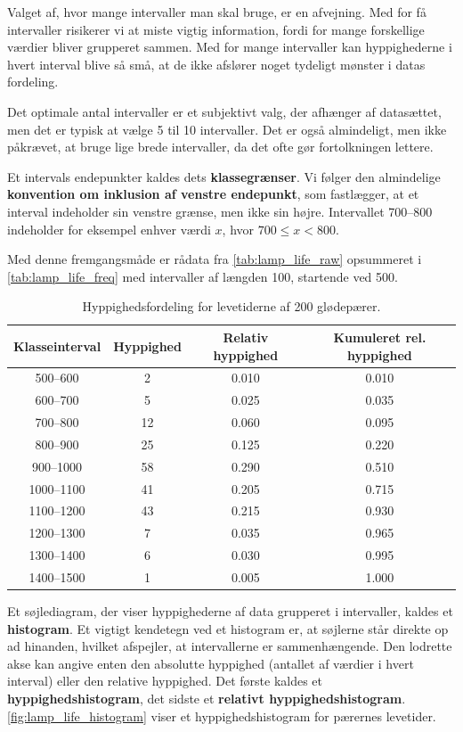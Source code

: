 Valget af, hvor mange intervaller man skal bruge, er en afvejning. Med for få intervaller risikerer vi at miste vigtig information, fordi for mange forskellige værdier bliver grupperet sammen. Med for mange intervaller kan hyppighederne i hvert interval blive så små, at de ikke afslører noget tydeligt mønster i datas fordeling.

Det optimale antal intervaller er et subjektivt valg, der afhænger af datasættet, men det er typisk at vælge 5 til 10 intervaller. Det er også almindeligt, men ikke påkrævet, at bruge lige brede intervaller, da det ofte gør fortolkningen lettere.

Et intervals endepunkter kaldes dets \textbf{klassegrænser}. Vi følger den almindelige \textbf{konvention om inklusion af venstre endepunkt}, som fastlægger, at et interval indeholder sin venstre grænse, men ikke sin højre. Intervallet 700--800 indeholder for eksempel enhver værdi \(x\), hvor \(700 \le x < 800\).

Med denne fremgangsmåde er rådata fra \autoref{tab:lamp_life_raw} opsummeret i \autoref{tab:lamp_life_freq} med intervaller af længden 100, startende ved 500.

\begin{table}[htbp]
\centering
\renewcommand{\arraystretch}{1.3}
{
\begin{tabular}{cccc}
\toprule
\textbf{Klasseinterval} & \textbf{Hyppighed} & \textbf{Relativ hyppighed} & \textbf{Kumuleret rel. hyppighed} \\
\midrule
500--600   & 2   & 0.010 & 0.010 \\
600--700   & 5   & 0.025 & 0.035 \\
700--800   & 12  & 0.060 & 0.095 \\
800--900   & 25  & 0.125 & 0.220 \\
900--1000  & 58  & 0.290 & 0.510 \\
1000--1100 & 41  & 0.205 & 0.715 \\
1100--1200 & 43  & 0.215 & 0.930 \\
1200--1300 & 7   & 0.035 & 0.965 \\
1300--1400 & 6   & 0.030 & 0.995 \\
1400--1500 & 1   & 0.005 & 1.000 \\
\bottomrule
\end{tabular}
}
\caption{Hyppighedsfordeling for levetiderne af 200 glødepærer.}
\label{tab:lamp_life_freq}
\end{table}

Et søjlediagram, der viser hyppighederne af data grupperet i intervaller, kaldes et \textbf{histogram}. Et vigtigt kendetegn ved et histogram er, at søjlerne står direkte op ad hinanden, hvilket afspejler, at intervallerne er sammenhængende. Den lodrette akse kan angive enten den absolutte hyppighed (antallet af værdier i hvert interval) eller den relative hyppighed. Det første kaldes et \textbf{hyppighedshistogram}, det sidste et \textbf{relativt hyppighedshistogram}. \autoref{fig:lamp_life_histogram} viser et hyppighedshistogram for pærernes levetider.

